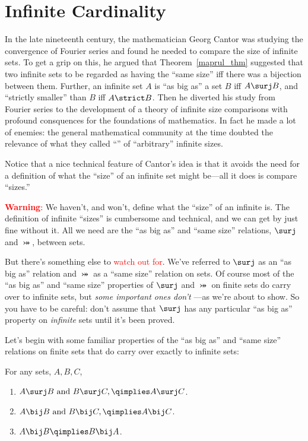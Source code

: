 \section{ Infinite Cardinality}

In the late nineteenth century, the mathematician Georg Cantor was
studying the convergence of Fourier series and found he needed to compare
the size of infinite sets.  To get a grip on this, he argued that
Theorem~\ref{maprul_thm} suggested that two infinite sets to be regarded
as having the ``same size'' iff there was a bijection between them.
Further, an infinite set $A$ is ``as big as'' a set $B$ iff $A \surj B$,
and ``strictly smaller'' than $B$ iff $A \strict B$.  Then he diverted his
study from Fourier series to the development of a theory of infinite size
comparisons with profound consquences for the foundations of mathematics.
In fact he made a lot of enemies: the general mathematical community at
the time doubted the relevance of what they called ``'' of ``arbitrary'' infinite sizes.

Notice that a nice technical feature of Cantor's idea is that it avoids
the need for a definition of what the ``size'' of an infinite set might
be---all it does is compare ``sizes.''

\textcolor{red}{\textbf{Warning}}: We haven't, and won't, define what the
``size'' of an infinite is.  The definition of infinite ``sizes'' is
cumbersome and technical, and we can get by just fine without it.  All we
need are the ``as big as'' and ``same size'' relations, $\surj$ and
$\bij$, between sets.

But there's something else to \textcolor{red}{watch out for}.  We've
referred to $\surj$ as an ``as big as'' relation and $\bij$ as a ``same
size'' relation on sets.  Of course most of the ``as big as'' and ``same
size'' properties of $\surj$ and $\bij$ on finite sets do carry over to
infinite sets, but \emph{some important ones don't} ---as we're about to
show.  So you have to be careful: don't assume that $\surj$ has any
particular ``as big as'' property on \emph{infinite} sets until it's been
proved.

Let's begin with some familiar properties of the ``as big as'' and ``same
size'' relations on finite sets that do carry over exactly to infinite
sets:
\begin{lemma}\label{translem}
For any sets, $A,B,C$,
\begin{enumerate}

\item \label{bigtrans}
$A \surj  B \text{ and } B \surj C, \qimplies  A \surj C$.

\item \label{sametrans} $A \bij B \text{ and } B \bij C, \qimplies A \bij C$.

\item\label{sameABA}
$A \bij B \qimplies B \bij A$.
\end{enumerate}
\end{lemma}

